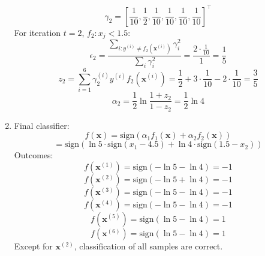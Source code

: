 \documentclass[12pt]{article}
\begin{document}
\begin{enumerate}
    \[\gamma_2 = [\frac{1}{10}, \frac{1}{2}, \frac{1}{10}, \frac{1}{10}, \frac{1}{10}, \frac{1}{10}]^{\top}\]
    For iteration $t=2$, $f_2:x_j<1.5$:
    \[\epsilon_2 = \frac{\sum_{i:y^{(i)}\neq f_2(\boldsymbol{x}^{(i)})}\gamma_i^2}{\sum_i\gamma_i^2} = \frac{2\cdot\frac{1}{10}}{1} = \frac{1}{5}\]
    \[z_2 = \sum_{i=1}^6\gamma_2^{(i)}y^{(i)}f_2(\boldsymbol{x}^{(i)}) = \frac{1}{2} + 3\cdot\frac{1}{10} - 2\cdot\frac{1}{10} = \frac{3}{5}\]
    \[\alpha_2 = \frac{1}{2}\ln\frac{1+z_2}{1-z_2} = \frac{1}{2}\ln4\]
    \item Final classifier:
    \[f(\boldsymbol{x}) = \text{sign}(\alpha_1f_1(\boldsymbol{x}) + \alpha_2f_2(\boldsymbol{x}))\]
    \[=\text{sign}(\ln5\cdot\text{sign}(x_1 - 4.5) + \ln4\cdot\text{sign}(1.5 - x_2))\]
    Outcomes:
    \[f(\boldsymbol{x}^{(1)}) = \text{sign}(-\ln5 - \ln4) = -1\]
    \[f(\boldsymbol{x}^{(2)}) = \text{sign}(-\ln5 + \ln4) = -1\]
    \[f(\boldsymbol{x}^{(3)}) = \text{sign}(-\ln5 - \ln4) = -1\]
    \[f(\boldsymbol{x}^{(4)}) = \text{sign}(-\ln5 - \ln4) = -1\]
    \[f(\boldsymbol{x}^{(5)}) = \text{sign}(\ln5 - \ln4) = 1\]
    \[f(\boldsymbol{x}^{(6)}) = \text{sign}(\ln5 - \ln4) = 1\]
    Except for $\boldsymbol{x}^{(2)}$, classification of all samples are correct.
\end{enumerate}
\newpage
\end{document}
